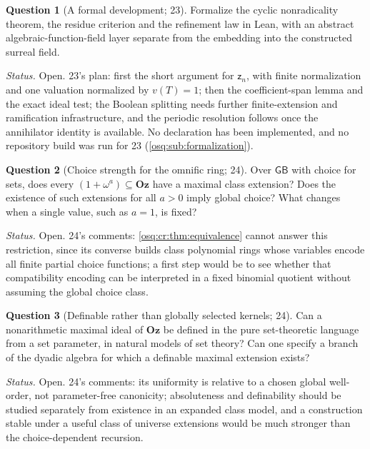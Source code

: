 \documentclass[11pt,letterpaper]{article}
\numberwithin{equation}{section}
\theoremstyle{definition}
\newtheorem{question}[question]{Question}
\theoremstyle{remark}
\theoremstyle{plain}
\newcommand{\Oz}{\mathbf{Oz}}
\begin{document}
\begin{question}[A formal development; 23]\label{osq:rm:q:formal}
Formalize the cyclic nonradicality theorem, the residue criterion and the refinement law in Lean, with an abstract algebraic-function-field layer
separate from the embedding into the constructed surreal field.
\end{question}
\emph{Status.} Open. 23's plan: first the short argument for $\mathsf z_n$, with finite normalization and one valuation normalized by $v(T)=1$; then
the coefficient-span lemma and the exact ideal test; the Boolean splitting needs further finite-extension and ramification infrastructure, and the
periodic resolution follows once the annihilator identity is available. No declaration has been implemented, and no repository build was run for 23
(\cref{osq:sub:formalization}).

\begin{question}[Choice strength for the omnific ring; 24]\label{osq:cr:q:choice}
Over $\mathsf{GB}$ with choice for sets, does every $(1+\omega^a)\subseteq\Oz$ have a maximal class extension? Does the existence of such extensions for
all $a>0$ imply global choice? What changes when a single value, such as $a=1$, is fixed?
\end{question}
\emph{Status.} Open. 24's comments: \cref{osq:cr:thm:equivalence} cannot answer this restriction, since its converse builds class polynomial rings whose
variables encode all finite partial choice functions; a first step would be to see whether that compatibility encoding can be interpreted in a fixed
binomial quotient without assuming the global choice class.

\begin{question}[Definable rather than globally selected kernels; 24]\label{osq:cr:q:definable}
Can a nonarithmetic maximal ideal of $\Oz$ be defined in the pure set-theoretic language from a set parameter, in natural models of set theory? Can one
specify a branch of the dyadic algebra for which a definable maximal extension exists?
\end{question}
\emph{Status.} Open. 24's comments: its uniformity is relative to a chosen global well-order, not parameter-free canonicity; absoluteness and
definability should be studied separately from existence in an expanded class model, and a construction stable under a useful class of universe
extensions would be much stronger than the choice-dependent recursion.
\end{document}
